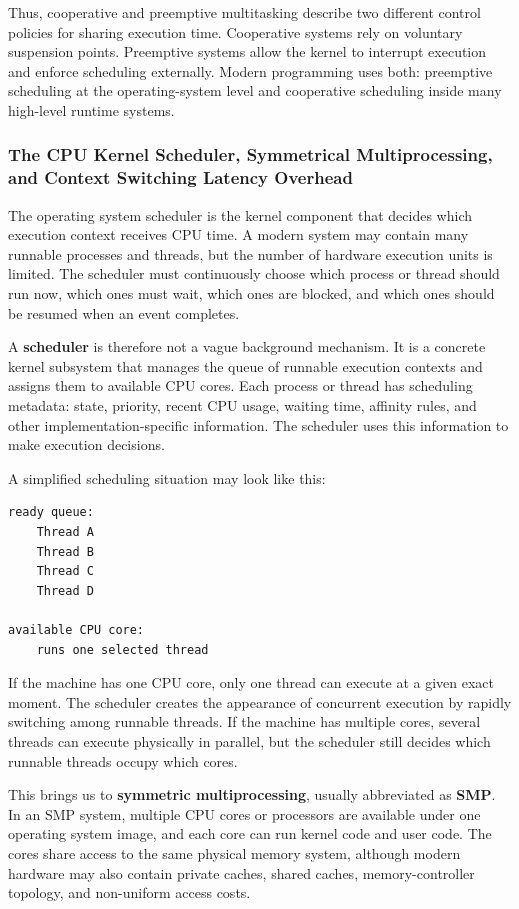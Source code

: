 Thus, cooperative and preemptive multitasking describe two different control policies for sharing execution time. Cooperative systems rely on voluntary suspension points. Preemptive systems allow the kernel to interrupt execution and enforce scheduling externally. Modern programming uses both: preemptive scheduling at the operating-system level and cooperative scheduling inside many high-level runtime systems.



\subsubsection{The CPU Kernel Scheduler, Symmetrical Multiprocessing, and Context Switching Latency Overhead}

The operating system scheduler is the kernel component that decides which execution context receives CPU time. A modern system may contain many runnable processes and threads, but the number of hardware execution units is limited. The scheduler must continuously choose which process or thread should run now, which ones must wait, which ones are blocked, and which ones should be resumed when an event completes.

A \textbf{scheduler} is therefore not a vague background mechanism. It is a concrete kernel subsystem that manages the queue of runnable execution contexts and assigns them to available CPU cores. Each process or thread has scheduling metadata: state, priority, recent CPU usage, waiting time, affinity rules, and other implementation-specific information. The scheduler uses this information to make execution decisions.

A simplified scheduling situation may look like this:

\begin{verbatim}
ready queue:
    Thread A
    Thread B
    Thread C
    Thread D

available CPU core:
    runs one selected thread
\end{verbatim}

If the machine has one CPU core, only one thread can execute at a given exact moment. The scheduler creates the appearance of concurrent execution by rapidly switching among runnable threads. If the machine has multiple cores, several threads can execute physically in parallel, but the scheduler still decides which runnable threads occupy which cores.

This brings us to \textbf{symmetric multiprocessing}, usually abbreviated as \textbf{SMP}. In an SMP system, multiple CPU cores or processors are available under one operating system image, and each core can run kernel code and user code. The cores share access to the same physical memory system, although modern hardware may also contain private caches, shared caches, memory-controller topology, and non-uniform access costs.

